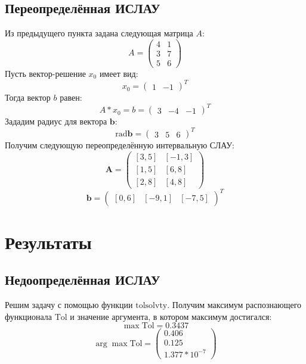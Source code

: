 \subsection{Переопределённая ИСЛАУ}
Из предыдущего пункта задана следующая матрица $A$:
\begin{equation}
	A =
	\begin{pmatrix}
		4 & 1 \\
		3 & 7 \\
		5 & 6
	\end{pmatrix}
\end{equation}
Пусть вектор-решение $x_0$ имеет вид:
\begin{equation}
	x_0=
	\begin{pmatrix}
		1 & -1
	\end{pmatrix}^T
\end{equation}
Тогда вектор $b$ равен:
\begin{equation}
	A*x_0=b=
	\begin{pmatrix}
		3 & -4 & -1
	\end{pmatrix}^T
\end{equation}
Зададим радиус для вектора $\textbf{b}$:
\begin{equation}
	\text{rad} \textbf{b}=
	\begin{pmatrix}
		3 & 5 & 6
	\end{pmatrix}^T
\end{equation}
Получим следующую переопределённую интервальную СЛАУ:
\begin{equation}
	\textbf{A} =
	\begin{pmatrix}
		[3,5] & [-1,3] \\
		[1,5] & [6,8] \\
		[2,8] & [4,8]
	\end{pmatrix}
\end{equation}
\begin{equation}
	\textbf{b}=
	\begin{pmatrix}
		[0,6] & [-9,1] & [-7, 5]
	\end{pmatrix}^T
\end{equation}



\section{Результаты}

\subsection{Недоопределённая ИСЛАУ}
Решим задачу с помощью функции $\text{tolsolvty}$. Получим максимум распознающего функционала $\text{Tol}$ и значение аргумента, в котором максимум достигался:
\begin{equation}
	\max \text{Tol} = 0.3437
\end{equation}
\begin{equation}
	\arg \max \text{Tol}=
	\begin{pmatrix}
		0.406 \\
		0.125 \\
		1.377 * 10^{-7}
	\end{pmatrix}
\end{equation}


